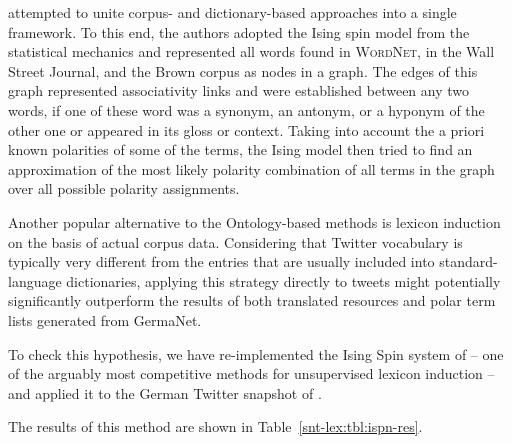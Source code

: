 \citet{Takamura:05} attempted to unite corpus- and dictionary-based
approaches into a single framework.  To this end, the authors adopted
the Ising spin model from the statistical mechanics and represented
all words found in \textsc{WordNet}, in the Wall Street Journal, and
the Brown corpus as nodes in a graph.  The edges of this graph
represented associativity links and were established between any two
words, if one of these word was a synonym, an antonym, or a hyponym of
the other one or appeared in its gloss or context.  Taking into
account the a priori known polarities of some of the terms, the Ising
model then tried to find an approximation of the most likely polarity
combination of all terms in the graph over all possible polarity
assignments.

Another popular alternative to the Ontology-based methods is lexicon
induction on the basis of actual corpus data.  Considering that
Twitter vocabulary is typically very different from the entries that
are usually included into standard-language dictionaries, applying
this strategy directly to tweets might potentially significantly
outperform the results of both translated resources and polar term
lists generated from GermaNet.

To check this hypothesis, we have re-implemented the Ising Spin system
of \citet{Takamura:05} -- one of the arguably most competitive methods
for unsupervised lexicon induction -- and applied it to the German
Twitter snapshot of \cite{Scheffler:14}.

The results of this method are shown in Table~\ref{snt-lex:tbl:ispn-res}.

